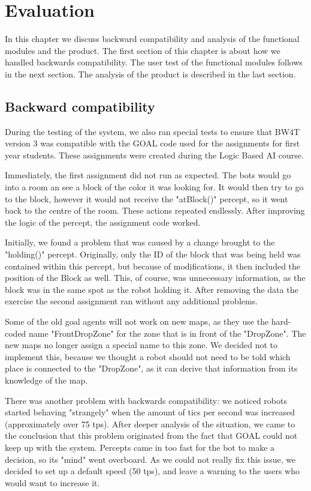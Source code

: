 \chapter{Evaluation}
In this chapter we discuss backward compatibility and analysis of the functional modules and the product. The first section of this chapter is about how we handled backwards compatibility. The user test of the functional modules follows in the next section. The analysis of the product is described in the last section.

\section{Backward compatibility}
During the testing of the system, we also ran special tests to ensure that BW4T version 3 was compatible with the GOAL code used for the assignments for first year students. These assignments were created during the Logic Based AI course.

Immediately, the first assignment did not run as expected. The bots would go into a room an see a block of the color it was looking for. It would then try to go to the block, however it would not receive the "atBlock()" percept, so it went back to the centre of the room. These actions repeated endlessly. After improving the logic of the percept, the assignment code worked.

Initially, we found a problem that was caused by a change brought to the "holding()" percept. Originally, only the ID of the block that was being held was contained within this percept, but because of modifications, it then included the position of the Block as well. This, of course, was unnecessary information, as the block was in the same spot as the robot holding it. After removing the data the exercise the second assignment ran without any additional problems.

Some of the old goal agents will not work on new maps, as they use the hard-coded name "FrontDropZone" for the zone that is in front of the "DropZone". The new maps no longer assign a special name to this zone. We decided not to implement this, because we thought a robot should not need to be told which place is connected to the "DropZone", as it can derive that information from its knowledge of the map.

There was another problem with backwards compatibility: we noticed robots started behaving "strangely" when the amount of tics per second was increased (approximately over 75 tps). After deeper analysis of the situation, we came to the conclusion that this problem originated from the fact that GOAL could not keep up with the system. Percepts came in too fast for the bot to make a decision, so its "mind" went overboard. As we could not really fix this issue, we decided to set up a default speed (50 tps), and leave a warning to the users who would want to increase it.

